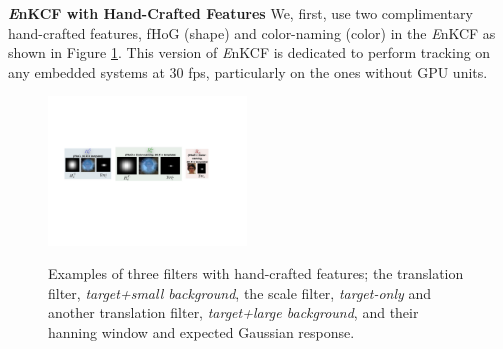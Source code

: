 \documentclass[10pt,twocolumn,letterpaper]{article}
\begin{document}
\textbf{{\it E}nKCF with Hand-Crafted Features} 
We, first, use two complimentary hand-crafted features, fHoG (shape) \cite{felzenszwalb2010object} 
and color-naming (color) \cite{li2014scale} in the {\it E}nKCF as shown in Figure \ref{fig:Filters}. 
This version of {\it E}nKCF is dedicated to perform tracking on any embedded systems at
$30$ fps, particularly on the ones without GPU units.
\begin{figure}[!h]
\centering
\includegraphics[width=0.47\textwidth]{./figures/Filters_Details.pdf}
   \\[-3ex]
\label{fig:Rt_S}
\quad{}\label{fig:Rt_L}
\quad\quad{}\label{fig:Rs}
\caption{Examples of three filters with hand-crafted features; the translation filter,
  \textit{target+small background}, the scale filter,
  \textit{target-only} and another translation filter,
  \textit{target+large background}, and their hanning window and
  expected Gaussian response.}
\label{fig:Filters}
\end{figure}
\end{document}
